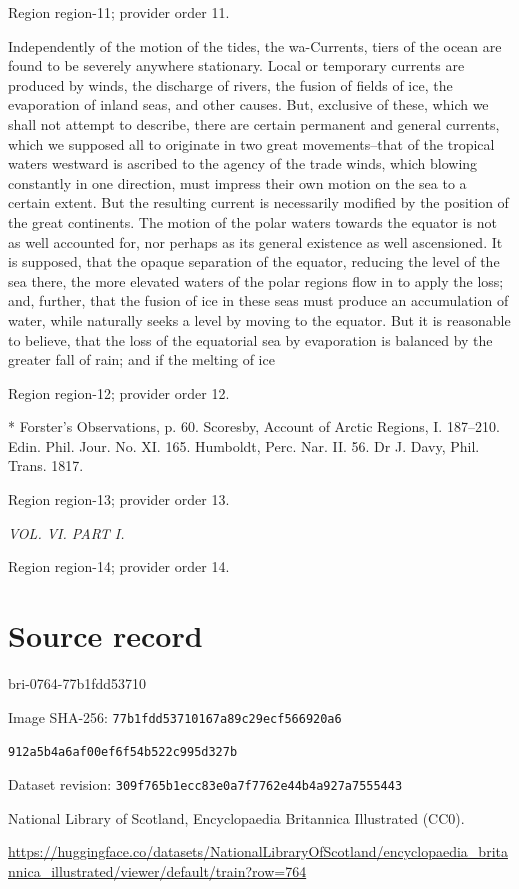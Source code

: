 \documentclass[11pt]{article}
\begin{document}
{\scriptsize\color{gray} Region region-11; provider order 11.\par}
\medskip

Independently of the motion of the tides, the wa-Currents, tiers of the ocean are found to be severely anywhere stationary. Local or temporary currents are produced by winds, the discharge of rivers, the fusion of fields of ice, the evaporation of inland seas, and other causes. But, exclusive of these, which we shall not attempt to describe, there are certain permanent and general currents, which we supposed all to originate in two great movements--that of the tropical waters westward is ascribed to the agency of the trade winds, which blowing constantly in one direction, must impress their own motion on the sea to a certain extent. But the resulting current is necessarily modified by the position of the great continents. The motion of the polar waters towards the equator is not as well accounted for, nor perhaps as its general existence as well ascensioned. It is supposed, that the opaque separation of the equator, reducing the level of the sea there, the more elevated waters of the polar regions flow in to apply the loss; and, further, that the fusion of ice in these seas must produce an accumulation of water, while naturally seeks a level by moving to the equator. But it is reasonable to believe, that the loss of the equatorial sea by evaporation is balanced by the greater fall of rain; and if the melting of ice
\par

{\scriptsize\color{gray} Region region-12; provider order 12.\par}
\medskip

* Forster’s Observations, p. 60. Scoresby, Account of Arctic Regions, I. 187–210. Edin. Phil. Jour. No. XI. 165. Humboldt, Perc. Nar. II. 56. Dr J. Davy, Phil. Trans. 1817.
\par

{\scriptsize\color{gray} Region region-13; provider order 13.\par}
\medskip

{\small\itshape VOL. VI. PART I.\par}

{\scriptsize\color{gray} Region region-14; provider order 14.\par}
\medskip
\newpage\section*{Source record}
bri-0764-77b1fdd53710\par
Image SHA-256: \texttt{77b1fdd53710167a89c29ecf566920a6}\par\texttt{912a5b4a6af00ef6f54b522c995d327b}\par
Dataset revision: \texttt{309f765b1ecc83e0a7f7}\texttt{762e44b4a927a7555443}\par
National Library of Scotland, Encyclopaedia Britannica Illustrated (CC0).\par
\url{https://huggingface.co/datasets/NationalLibraryOfScotland/encyclopaedia_britannica_illustrated/viewer/default/train?row=764}
\end{document}
